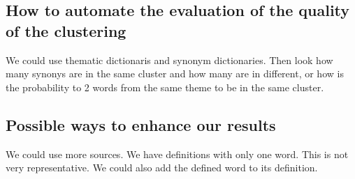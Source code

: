 \documentclass{eplDoc}
\begin{document}
\subsection{How to automate the evaluation of the quality of the clustering} %
We could use thematic dictionaris and synonym dictionaries.  Then look how many synonys are in the same cluster and how many are in different, or how is the probability to 2 words from the same theme to be in the same cluster.


\subsection{Possible ways to enhance our results} %
We could use more sources.  We have definitions with only one word.  This is not very representative.  We could also add the defined word to its definition.
\end{document}
